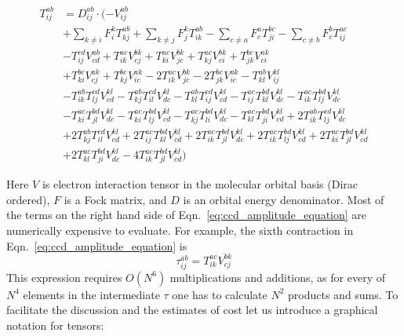 \begin{equation}
\begin{split}
T^{ab}_{ij} & = D^{ab}_{ij} \cdot (- V^{ab}_{ij} \\
& + \sum_{k \neq i} F^{k}_{i} T^{ab}_{kj}
+  \sum_{k \neq j} F^{k}_{j}  T^{ab}_{ik}
- \sum_{c \neq a} F^{a}_{c}  T^{bc}_{ji}
- \sum_{c \neq b} F^{b}_{c}  T^{ac}_{ij} \\
& - T^{cd}_{ij}  V^{ab}_{cd}
+ T^{ac}_{ik}  V^{bk}_{cj} 
+ T^{ac}_{ki}  V^{bk}_{jc} 
+ T^{ac}_{kj}  V^{bk}_{ci} 
+ T^{bc}_{jk}  V^{ak}_{ci}\\
&+ T^{bc}_{ki}  V^{ak}_{cj} 
+ T^{bc}_{kj}  V^{ak}_{ic}
- 2 T^{ac}_{ik}  V^{bk}_{jc}
- 2 T^{bc}_{jk}  V^{ak}_{ic}
- T^{ab}_{kl}  V^{kl}_{ij} \\
&- T^{ab}_{ik}  T^{cd}_{lj}  V^{kl}_{cd} 
- T^{ab}_{kj}  T^{cd}_{il} V^{kl}_{dc}
- T^{ab}_{kl}  T^{cd}_{ij} V^{kl}_{cd}
- T^{ac}_{ij}  T^{bd}_{kl}  V^{kl}_{dc}
-  T^{ac}_{ik}  T^{bd}_{lj} V^{kl}_{dc} \\
&- T^{ac}_{ki}  T^{bd}_{jl} V^{kl}_{dc}
- T^{ac}_{ki}  T^{bd}_{lj} V^{kl}_{cd}
- T^{ac}_{kj}  T^{bd}_{li} V^{kl}_{dc}
-  T^{ac}_{kl}  T^{bd}_{ji} V^{kl}_{cd}
+ 2    T^{ab}_{ik} T^{cd}_{lj}  V^{kl}_{dc}\\
&+ 2    T^{ab}_{kj} T^{cd}_{il}  V^{kl}_{cd}
+ 2    T^{ac}_{ij} T^{bd}_{kl}  V^{kl}_{cd}
+ 2    T^{ac}_{ik}  T^{bd}_{jl}  V^{kl}_{dc}
+ 2    T^{ac}_{ik}  T^{bd}_{lj}  V^{kl}_{cd}  
+ 2    T^{ac}_{ki} T^{bd}_{jl}  V^{kl}_{cd}\\
&+ 2    T^{ac}_{kl} T^{bd}_{ji}  V^{kl}_{dc}
- 4    T^{ac}_{ik} T^{bd}_{jl}  V^{kl}_{cd})
\end{split}
\label{eq:ccd_amplitude_equation}
\end{equation}

Here $V$ is electron interaction tensor in the molecular orbital basis (Dirac 
ordered), $F$ is a Fock matrix, and $D$ is an orbital energy denominator. Most 
of the terms on the right hand side of Eqn.~\ref{eq:ccd_amplitude_equation} are 
numerically expensive to evaluate. For example, the sixth 
contraction in Eqn.~\ref{eq:ccd_amplitude_equation} is
\begin{equation}
 \tau^{ab}_{ij} = T^{ac}_{ik}  V^{bk}_{cj}
 \label{eq:ccd_intermediate_example}
\end{equation}
This expression requires $O(N^6)$ multiplications and additions, as for every 
of $N^4$ elements in the intermediate $\tau$ one has to calculate $N^2$ products
and sums. To facilitate the discussion and the estimates of cost let us 
introduce a graphical notation for tensors:

